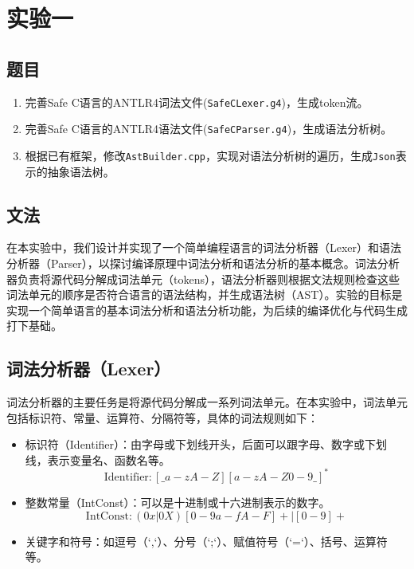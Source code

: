 \documentclass[../main.tex]{subfiles}
\begin{document}
\section{实验一}

\subsection{题目}

\kaishu

\begin{enumerate}
	\item 完善Safe C语言的ANTLR4词法文件(\texttt{SafeCLexer.g4})，生成token流。
	\item 完善Safe C语言的ANTLR4语法文件(\texttt{SafeCParser.g4})，生成语法分析树。
	\item 根据已有框架，修改\texttt{AstBuilder.cpp}，实现对语法分析树的遍历，生成\texttt{Json}表示的抽象语法树。
\end{enumerate}

\subsection{文法}

在本实验中，我们设计并实现了一个简单编程语言的词法分析器（Lexer）和语法分析器（Parser），以探讨编译原理中词法分析和语法分析的基本概念。词法分析器负责将源代码分解成词法单元（tokens），语法分析器则根据文法规则检查这些词法单元的顺序是否符合语言的语法结构，并生成语法树（AST）。实验的目标是实现一个简单语言的基本词法分析和语法分析功能，为后续的编译优化与代码生成打下基础。

\subsection{词法分析器（Lexer）}

词法分析器的主要任务是将源代码分解成一系列词法单元。在本实验中，词法单元包括标识符、常量、运算符、分隔符等，具体的词法规则如下：

\begin{itemize}
	\item 标识符（Identifier）：由字母或下划线开头，后面可以跟字母、数字或下划线，表示变量名、函数名等。
	\[
	\text{Identifier} \colon [\_a-zA-Z][a-zA-Z0-9\_]^*
	\]
	
	\item 整数常量（IntConst）：可以是十进制或十六进制表示的数字。
	\[
	\text{IntConst} \colon (0x | 0X)[0-9a-fA-F]+ \mid [0-9]+
	\]
	
	\item 关键字和符号：如逗号（`,`）、分号（`;`）、赋值符号（`=`）、括号、运算符等。
\end{itemize}
\end{document}
